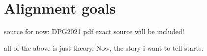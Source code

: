 \section{Alignment goals}
source for now: DPG2021 pdf exact source will be included!

all of the above is just theory. Now, the story i want to tell starts.
